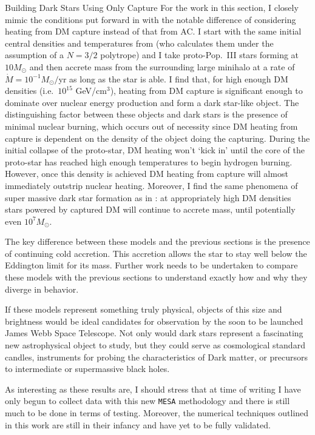 \documentclass[a4paper,11pt]{article}
\begin{document}
\begin{section}{Building Dark Stars Using Only Capture}
    For the work in this section, I closely mimic the conditions put forward in \cite{Rindler-Daller:2015} with the notable difference of considering heating from DM capture instead of that from AC.
    I start with the same initial central densities and temperatures from \cite{Rindler-Daller:2020}(who calculates them under the assumption of a $N=3/2$ polytrope) and I take proto-Pop.~III stars forming at $10 M_{\odot}$ and then accrete mass from the surrounding large minihalo at a rate of $\dot{M} = 10^{-1} M_{\odot}/$yr as long as the star is able.
    I find that, for high enough DM densities (i.e.~$10^{15}$ GeV/cm$^3$), heating from DM capture is significant enough to dominate over nuclear energy production and form a dark star-like object.
    The distinguishing factor between these objects and dark stars is the presence of minimal nuclear burning, which occurs out of necessity since DM heating from capture is dependent on the density of the object doing the capturing.
    During the initial collapse of the proto-star, DM heating won't `kick in' until the core of the proto-star has reached high enough temperatures to begin hydrogen burning.
    However, once this density is achieved DM heating from capture will almost immediately outstrip nuclear heating.
    Moreover, I find the same phenomena of super massive dark star formation as in \cite{Rindler-Daller:2015}: at appropriately high DM densities stars powered by captured DM will continue to accrete mass, until potentially even $10^7 M_{\odot}$.

    The key difference between these models and the previous sections is the presence of continuing cold accretion.
    This accretion allows the star to stay well below the Eddington limit for its mass.
    Further work needs to be undertaken to compare these models with the previous sections to understand exactly how and why they diverge in behavior.

    If these models represent something truly physical, objects of this size and brightness would be ideal candidates for observation by the soon to be launched James Webb Space Telescope.
    Not only would dark stars represent a fascinating new astrophysical object to study, but they could serve as cosmological standard candles, instruments for probing the characteristics of Dark matter, or precursors to intermediate or supermassive black holes.

    As interesting as these results are, I should stress that at time of writing I have only begun to collect data with this new \texttt{MESA} methodology and there is still much to be done in terms of testing. 
    Moreover, the numerical techniques outlined in this work are still in their infancy and have yet to be fully validated.
\end{section}
\end{document}
